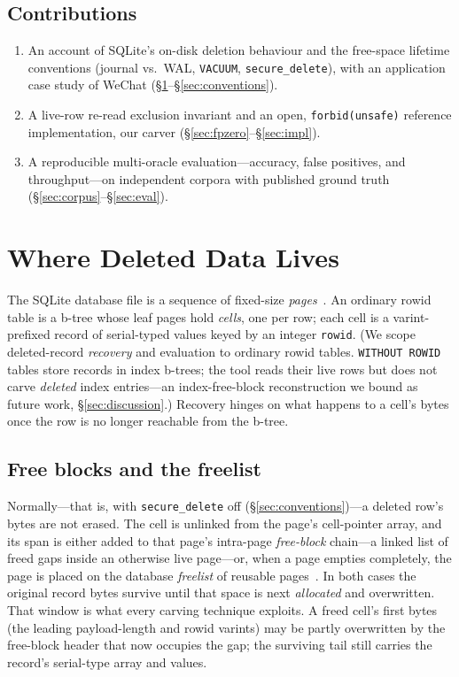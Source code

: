 \documentclass[10pt,a4paper]{article}
\newcommand{\code}[1]{\texttt{#1}}
\newcommand{\sys}{our carver}
\newcommand{\sys}{\texttt{sqlite4n6}}
\begin{document}
\subsection*{Contributions}
\begin{enumerate}[leftmargin=1.4em,itemsep=2pt]
  \item An account of SQLite's on-disk deletion behaviour and the free-space
        lifetime conventions (journal vs.\ WAL, \code{VACUUM}, \code{secure\_delete}),
        with an application case study of WeChat
        (\S\ref{sec:storage}--\S\ref{sec:conventions}).
  \item A live-row re-read exclusion invariant and an open, \code{forbid(unsafe)}
        reference implementation, \sys
        (\S\ref{sec:fpzero}--\S\ref{sec:impl}).
  \item A reproducible multi-oracle evaluation---accuracy, false positives, and
        throughput---on independent corpora with published ground truth
        (\S\ref{sec:corpus}--\S\ref{sec:eval}).
\end{enumerate}

\section{Where Deleted Data Lives}\label{sec:storage}

The SQLite database file is a sequence of fixed-size \emph{pages}~\cite{sqlite_fileformat}.
An ordinary rowid table is a b-tree whose leaf pages hold \emph{cells}, one per
row; each cell is a varint-prefixed record of serial-typed values keyed by an
integer \code{rowid}. (We scope deleted-record \emph{recovery} and evaluation to
ordinary rowid tables. \code{WITHOUT ROWID} tables store records in index b-trees;
the tool reads their live rows but does not carve \emph{deleted} index entries---an
index-free-block reconstruction we bound as future work, \S\ref{sec:discussion}.)
Recovery hinges on what happens to a cell's bytes once the row is no longer
reachable from the b-tree.

\subsection*{Free blocks and the freelist}
Normally---that is, with \code{secure\_delete} off (\S\ref{sec:conventions})---a
deleted row's bytes are not erased. The cell is unlinked from the page's
cell-pointer array, and its span is either added to that page's intra-page
\emph{free-block} chain---a linked list of freed gaps inside an otherwise live
page---or, when a page empties completely, the page is placed on the database
\emph{freelist} of reusable pages~\cite{sqlite_fileformat}. In both cases the
original record bytes survive until that space is next \emph{allocated} and
overwritten. That window is what every carving technique exploits. A freed cell's
first bytes (the leading payload-length and rowid varints) may be partly
overwritten by the free-block header that now occupies the gap; the surviving tail
still carries the record's serial-type array and values.
\end{document}
